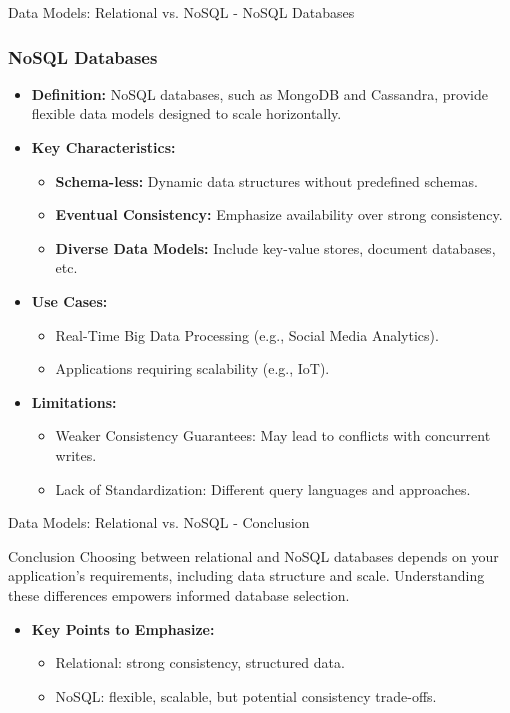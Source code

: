 \documentclass[aspectratio=169]{beamer}
\begin{document}
\begin{frame}[fragile]{Data Models: Relational vs. NoSQL - NoSQL Databases}
    \frametitle{NoSQL Databases}
    \begin{itemize}
        \item \textbf{Definition:} NoSQL databases, such as MongoDB and Cassandra, provide flexible data models designed to scale horizontally.
        \item \textbf{Key Characteristics:}
            \begin{itemize}
                \item \textbf{Schema-less:} Dynamic data structures without predefined schemas.
                \item \textbf{Eventual Consistency:} Emphasize availability over strong consistency.
                \item \textbf{Diverse Data Models:} Include key-value stores, document databases, etc.
            \end{itemize}
        \item \textbf{Use Cases:}
            \begin{itemize}
                \item Real-Time Big Data Processing (e.g., Social Media Analytics).
                \item Applications requiring scalability (e.g., IoT).
            \end{itemize}
        \item \textbf{Limitations:}
            \begin{itemize}
                \item Weaker Consistency Guarantees: May lead to conflicts with concurrent writes.
                \item Lack of Standardization: Different query languages and approaches.
            \end{itemize}
    \end{itemize}
\end{frame}

\begin{frame}[fragile]{Data Models: Relational vs. NoSQL - Conclusion}
    \begin{block}{Conclusion}
        Choosing between relational and NoSQL databases depends on your application's requirements, including data structure and scale. Understanding these differences empowers informed database selection.
    \end{block}
    \begin{itemize}
        \item \textbf{Key Points to Emphasize:}
            \begin{itemize}
                \item Relational: strong consistency, structured data.
                \item NoSQL: flexible, scalable, but potential consistency trade-offs.
            \end{itemize}
    \end{itemize}
\end{frame}
\end{document}
